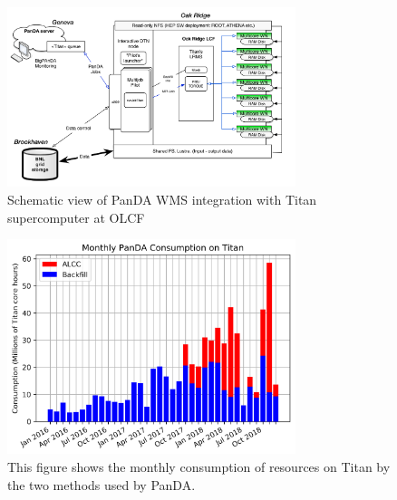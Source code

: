 
\begin{figure}
  \includegraphics[width=0.75\textwidth]{images/Figure_5.png}
\caption{Schematic view of PanDA WMS integration with Titan supercomputer at OLCF}
\label{fig:implementation}
\end{figure}


\begin{figure}
  \includegraphics[width=0.75\textwidth]{images/monthly-consumption.png}
\caption{This figure shows the monthly consumption of resources on Titan by the
two methods used by PanDA.}
\label{fig:monthly-consumption}
\end{figure}


